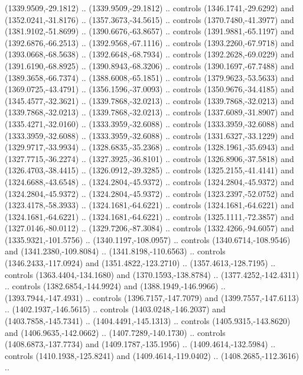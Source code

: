 \begin{scope}[shift={(-22.88722,-49.76189)}]
\begin{scope}[shift={(-739.46591,328.36782)}]
      (1339.9509,-29.1812) .. (1339.9509,-29.1812) .. controls (1346.1741,-29.6292)
      and (1352.0241,-31.8176) .. (1357.3673,-34.5615) .. controls
      (1370.7480,-41.3977) and (1381.9102,-51.8699) .. (1390.6676,-63.8657) ..
      controls (1391.9881,-65.1197) and (1392.6876,-66.2513) .. (1392.9568,-67.1116)
      .. controls (1393.2260,-67.9718) and (1393.0668,-68.5638) ..
      (1392.6648,-68.7934) .. controls (1392.2628,-69.0229) and (1391.6190,-68.8925)
      .. (1390.8943,-68.3206) .. controls (1390.1697,-67.7488) and
      (1389.3658,-66.7374) .. (1388.6008,-65.1851) .. controls (1379.9623,-53.5633)
      and (1369.0725,-43.4791) .. (1356.1596,-37.0093) .. controls
      (1350.9676,-34.4185) and (1345.4577,-32.3621) .. (1339.7868,-32.0213) ..
      controls (1339.7868,-32.0213) and (1339.7868,-32.0213) .. (1339.7868,-32.0213)
      .. controls (1337.6089,-31.8907) and (1335.4271,-32.0160) ..
      (1333.3959,-32.6088) .. controls (1333.3959,-32.6088) and (1333.3959,-32.6088)
      .. (1333.3959,-32.6088) .. controls (1331.6327,-33.1229) and
      (1329.9717,-33.9934) .. (1328.6835,-35.2368) .. controls (1328.1961,-35.6943)
      and (1327.7715,-36.2274) .. (1327.3925,-36.8101) .. controls
      (1326.8906,-37.5818) and (1326.4703,-38.4415) .. (1326.0912,-39.3285) ..
      controls (1325.2155,-41.4141) and (1324.6688,-43.6548) .. (1324.2804,-45.9372)
      .. controls (1324.2804,-45.9372) and (1324.2804,-45.9372) ..
      (1324.2804,-45.9372) .. controls (1323.2397,-52.0752) and (1323.4178,-58.3933)
      .. (1324.1681,-64.6221) .. controls (1324.1681,-64.6221) and
      (1324.1681,-64.6221) .. (1324.1681,-64.6221) .. controls (1325.1111,-72.3857)
      and (1327.0146,-80.0112) .. (1329.7206,-87.3084) .. controls
      (1332.4266,-94.6057) and (1335.9321,-101.5756) .. (1340.1197,-108.0957) ..
      controls (1340.6714,-108.9546) and (1341.2380,-109.8084) ..
      (1341.8198,-110.6563) .. controls (1346.2433,-117.0924) and
      (1351.4822,-123.2710) .. (1357.4613,-128.7195) .. controls
      (1363.4404,-134.1680) and (1370.1593,-138.8784) .. (1377.4252,-142.4311) ..
      controls (1382.6854,-144.9924) and (1388.1949,-146.9966) ..
      (1393.7944,-147.4931) .. controls (1396.7157,-147.7079) and
      (1399.7557,-147.6113) .. (1402.1937,-146.5615) .. controls
      (1403.0248,-146.2037) and (1403.7858,-145.7341) .. (1404.4491,-145.1313) ..
      controls (1405.9315,-143.8620) and (1406.9635,-142.0662) ..
      (1407.7289,-140.1730) .. controls (1408.6873,-137.7734) and
      (1409.1787,-135.1956) .. (1409.4614,-132.5984) .. controls
      (1410.1938,-125.8241) and (1409.4614,-119.0402) .. (1408.2685,-112.3616) ..

\end{scope}
\end{scope}
